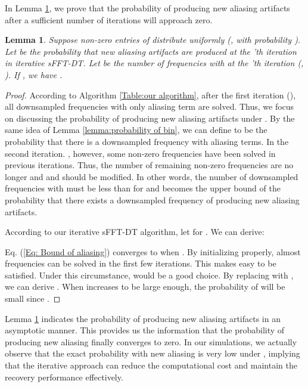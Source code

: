 \documentclass[journal,onecolumn,11pt]{IEEEtran}
\newtheorem{lemma}{Lemma}
\begin{document}
In Lemma \ref{lemma:probabilityofaliasing}, we prove that the probability of producing new aliasing artifacts after a sufficient number of iterations will approach zero.

\begin{lemma}
\label{lemma:probabilityofaliasing}
Suppose  non-zero entries of  distribute uniformly ({}, with probability ).
Let  be the probability that new aliasing artifacts are produced at the 'th iteration in iterative sFFT-DT. Let  be the number of frequencies with  at the 'th iteration (, ). If , we have .
\end{lemma}

\begin{proof}
According to Algorithm \ref{Table:our algorithm}, after the first iteration (), all downsampled frequencies with only  aliasing term are solved.
Thus, we focus on discussing the probability of producing new aliasing artifacts under .
By the same idea of Lemma \ref{lemma:probability of bin}, we can define  to be the probability that there is a downsampled frequency with  aliasing terms.
In the second iteration. , however, some non-zero frequencies have been solved in previous iterations.
Thus, the number of remaining non-zero frequencies are no longer  and  and should be modified.
In other words, the number of downsampled frequencies with  must be less than  for  and  becomes the upper bound of the probability that there exists a downsampled frequency of producing new aliasing artifacts.

According to our iterative sFFT-DT algorithm, let  for .
We can derive:
\small

\normalsize
Eq. (\ref{Eq: Bound of aliasing}) converges to  when . By initializing  properly, almost  frequencies can be solved in the first few iterations. This makes  easy to be satisfied.
Under this circumstance,  would be a good choice. By replacing  with , we can derive .
When  increases to be large enough, the probability of  will be small since . \end{proof}

Lemma \ref{lemma:probabilityofaliasing} indicates the probability of producing new aliasing artifacts in an asymptotic manner.
This provides us the information that the probability of producing new aliasing finally converges to zero.
In our simulations, we actually observe that the exact probability with new aliasing is very low under , implying that the iterative approach can reduce the computational cost and maintain the recovery performance effectively.
\end{document}
